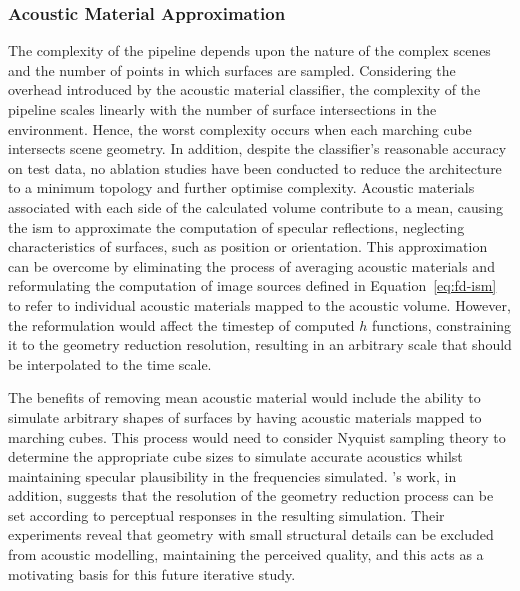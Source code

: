 \subsubsection{Acoustic Material Approximation}
The complexity of the pipeline depends upon the nature of the complex scenes and the number of points in which surfaces are sampled. Considering the overhead introduced by the acoustic material classifier, the complexity of the pipeline scales linearly with the number of surface intersections in the environment. Hence, the worst complexity occurs when each marching cube intersects scene geometry. In addition, despite the classifier's reasonable accuracy on test data, no ablation studies have been conducted to reduce the architecture to a minimum topology and further optimise complexity. Acoustic materials associated with each side of the calculated volume contribute to a mean, causing the \acrshort{ism} to approximate the computation of specular reflections, neglecting characteristics of surfaces, such as position or orientation. This approximation can be overcome by eliminating the process of averaging acoustic materials and reformulating the computation of image sources defined in Equation~\ref{eq:fd-ism} to refer to individual acoustic materials mapped to the acoustic volume. However, the reformulation would affect the timestep of computed $h$ functions, constraining it to the geometry reduction resolution, resulting in an arbitrary scale that should be interpolated to the time scale.\par
The benefits of removing mean acoustic material would include the ability to simulate arbitrary shapes of surfaces by having acoustic materials mapped to marching cubes. This process would need to consider Nyquist sampling theory to determine the appropriate cube sizes to simulate accurate acoustics whilst maintaining specular plausibility in the frequencies simulated. \citep{pelzer2010frequency}'s work, in addition, suggests that the resolution of the geometry reduction process can be set according to perceptual responses in the resulting simulation. Their experiments reveal that geometry with small structural details can be excluded from acoustic modelling, maintaining the perceived quality, and this acts as a motivating basis for this future iterative study.\par

